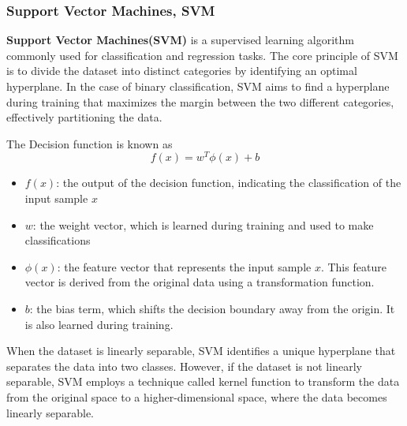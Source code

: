 \documentclass[a4paper]{article}
\begin{document}
\subsubsection{Support Vector Machines, SVM}

\textbf{Support Vector Machines(SVM)} is a supervised learning algorithm commonly used for classification and regression tasks. The core principle of SVM is to divide the dataset into distinct categories by identifying an optimal hyperplane. In the case of binary classification, SVM aims to find a hyperplane during training that maximizes the margin between the two different categories, effectively partitioning the data.

The Decision function is known as$$f(x) = w^T \phi(x) + b$$
\begin{itemize}
    \item $f(x)$: the output of the decision function, indicating the classification of the input sample $x$
    \item $w$: the weight vector, which is learned during training and used to make classifications
    \item $\phi(x)$: the feature vector that represents the input sample $x$. This feature vector is derived from the original data using a transformation function.
    \item $b$: the bias term, which shifts the decision boundary away from the origin. It is also learned during training.
\end{itemize}

When the dataset is linearly separable, SVM identifies a unique hyperplane that separates the data into two classes. However, if the dataset is not linearly separable, SVM employs a technique called kernel function to transform the data from the original space to a higher-dimensional space, where the data becomes linearly separable.\cite{ref_svm1}
\end{document}
